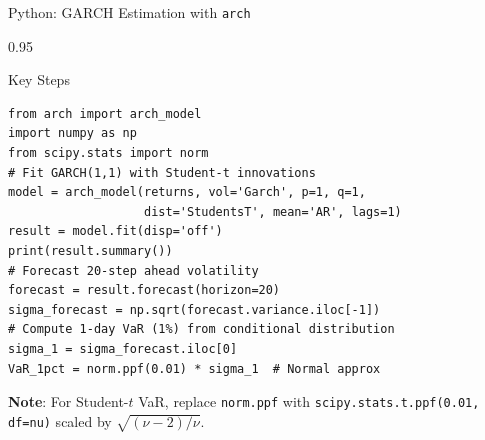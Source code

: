 \documentclass[9pt, aspectratio=169, t]{beamer}
\begin{document}
\begin{frame}[fragile]{Python: GARCH Estimation with \texttt{arch}}
    \begin{cminipage}{0.95\textwidth}
    \vspace{-3mm}
    {\scriptsize
    \begin{block}{Key Steps}
    \begin{lstlisting}
from arch import arch_model
import numpy as np
from scipy.stats import norm
# Fit GARCH(1,1) with Student-t innovations
model = arch_model(returns, vol='Garch', p=1, q=1,
                   dist='StudentsT', mean='AR', lags=1)
result = model.fit(disp='off')
print(result.summary())
# Forecast 20-step ahead volatility
forecast = result.forecast(horizon=20)
sigma_forecast = np.sqrt(forecast.variance.iloc[-1])
# Compute 1-day VaR (1%) from conditional distribution
sigma_1 = sigma_forecast.iloc[0]
VaR_1pct = norm.ppf(0.01) * sigma_1  # Normal approx
    \end{lstlisting}
    \end{block}
    \vspace{-2mm}
    \textbf{Note}: For Student-$t$ VaR, replace \texttt{norm.ppf} with \texttt{scipy.stats.t.ppf(0.01, df=nu)} scaled by $\sqrt{(\nu-2)/\nu}$.
    }
    \end{cminipage}
\end{frame}
\end{document}
